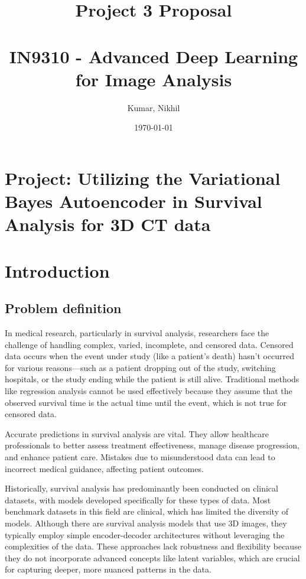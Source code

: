 \documentclass{article}
\title{Project 3 Proposal  \\ \ \\IN9310 - Advanced Deep Learning for Image Analysis
}
\author{Kumar, Nikhil}
\date{\today}
\begin{document}
\maketitle


\section*{Project: Utilizing the Variational Bayes Autoencoder in Survival Analysis for 3D CT data}


\section{Introduction}
\subsection{Problem definition}
In medical research, particularly in survival analysis, researchers face the challenge of handling complex, varied, incomplete, and censored data. Censored data occurs when the event under study (like a patient's death) hasn't occurred for various reasons—such as a patient dropping out of the study, switching hospitals, or the study ending while the patient is still alive. Traditional methods like regression analysis cannot be used effectively because they assume that the observed survival time is the actual time until the event, which is not true for censored data.   

Accurate predictions in survival analysis are vital. They allow healthcare professionals to better assess treatment effectiveness, manage disease progression, and enhance patient care. Mistakes due to misunderstood data can lead to incorrect medical guidance, affecting patient outcomes.

Historically, survival analysis has predominantly been conducted on clinical datasets, with models developed specifically for these types of data. Most benchmark datasets in this field are clinical, which has limited the diversity of models. Although there are survival analysis models that use 3D images, they typically employ simple encoder-decoder architectures without leveraging the complexities of the data. These approaches lack robustness and flexibility because they do not incorporate advanced concepts like latent variables, which are crucial for capturing deeper, more nuanced patterns in the data. 
\end{document}
